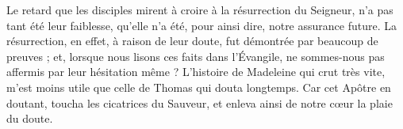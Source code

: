 Le retard que les disciples mirent à croire à la résurrection du Seigneur, n’a pas tant été leur faiblesse, qu’elle n’a été, pour ainsi dire, notre assurance future. La résurrection, en effet, à raison de leur doute, fut démontrée par beaucoup de preuves ; et, lorsque nous lisons ces faits dans l’Évangile, ne sommes-nous pas affermis par leur hésitation même ? L’histoire de Madeleine qui crut très vite, m’est moins utile que celle de Thomas qui douta longtemps. Car cet Apôtre en doutant, toucha les cicatrices du Sauveur, et enleva ainsi de notre cœur la plaie du doute.
